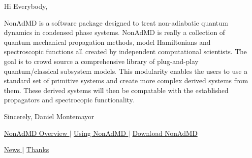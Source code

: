 Hi Everybody,

Non\-Ad\-M\-D is a software package designed to treat non-\/adiabatic quantum dynamics in condensed phase systems. Non\-Ad\-M\-D is really a collection of quantum mechanical propagation methods, model Hamiltonians and spectroscopic functions all created by independent computational scientists. The goal is to crowd source a comprehensive library of plug-\/and-\/play quantum/classical subsystem models. This modularity enables the users to use a standard set of primitive systems and create more complex derived systems from them. These derived systems will then be compatable with the established propagators and spectrocopic functionality.

Sincerely, Daniel Montemayor

\begin{center} \hyperlink{_overview}{Non\-Ad\-M\-D Overview } $|$ \hyperlink{_interface}{Using Non\-Ad\-M\-D } $|$ \hyperlink{_tags}{Download Non\-Ad\-M\-D } \end{center}  \begin{center} \hyperlink{_n_e_w_s}{News } $|$ \hyperlink{_t_h_a_n_k_s}{Thanks } \end{center}  